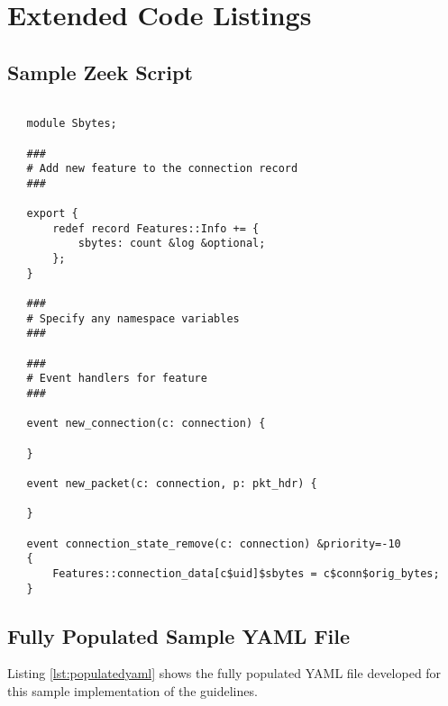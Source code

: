 \documentclass[sigconf, anonymous, screen]{acmart}
\begin{document}
\section{Extended Code Listings}

\begin{minipage}{\linewidth}
\subsection{Sample Zeek Script}
\begin{lstlisting}[label=lst:zeeksamplescript, caption={
    A sample Zeek script that creates the single feature for source bytes.
    This script would be identified in a $\_\_load\_\_.zeek$ file and executed using the Zeek wrapper script provided by our sample implementation.
    Each script provides the feature name and implements supported Zeek callback functions.
    While we provide a default set of callbacks, others could  be added to this file if needed.
    One can see that breaking up the features into their own code unit makes understanding how they are generated straightforward.
    }, captionpos=b, basicstyle=\small, backgroundcolor=\color{gray!10!white}, frame=stb, breaklines=True]

   module Sbytes;
   
   ###
   # Add new feature to the connection record
   ###
   
   export {
       redef record Features::Info += {
           sbytes: count &log &optional;
       };
   }
   
   ###
   # Specify any namespace variables
   ###
   
   ###
   # Event handlers for feature
   ###
   
   event new_connection(c: connection) {
   
   }
   
   event new_packet(c: connection, p: pkt_hdr) {
   
   }
   
   event connection_state_remove(c: connection) &priority=-10
   {
       Features::connection_data[c$uid]$sbytes = c$conn$orig_bytes;
   }
\end{lstlisting}
\end{minipage}

\subsection{Fully Populated Sample YAML File}
Listing \ref{lst:populatedyaml} shows the fully populated YAML file developed for this sample implementation of the guidelines.
\end{document}
